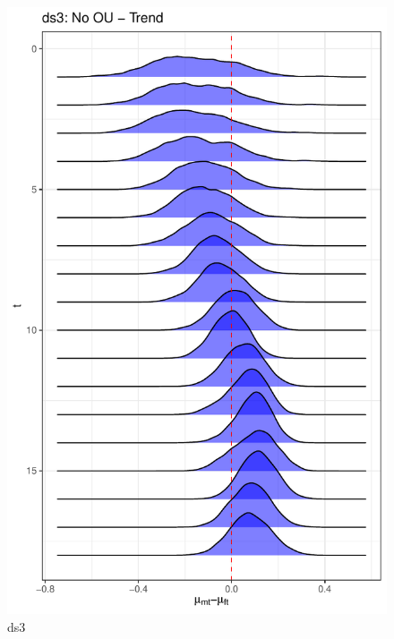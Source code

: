 \documentclass[
  12pt,
]{article}
\begin{document}
\begin{figure}

{\centering \includegraphics[width=0.9\linewidth]{../Figures/ds3/mu_diff} 

}

\caption{ds3}\label{fig:unnamed-chunk-9}
\end{figure}
\end{document}
